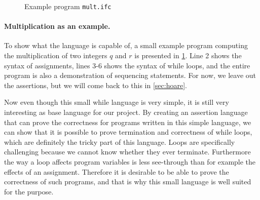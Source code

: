 \begin{figure}

\caption{Example program \texttt{mult.ifc}}
\label{figure:basicmult}
\end{figure}

\paragraph{Multiplication as an example.}
To show what the language is capable of, a small example program computing the multiplication of two integers $q$ and $r$ is presented in \cref{figure:basicmult}. Line 2 shows the syntax of assignments, lines $3$-$6$ shows the syntax of while loops, and the entire program is also a demonstration of sequencing statements.
For now, we leave out the assertions, but we will come back to this in \cref{sec:hoare}.

Now even though this small while language is very simple, it is still very interesting as base language for our project.
By creating an assertion language that can prove the correctness for programs written in this simple language, we can show that it is possible to prove termination and correctness of while loops, which are definitely the tricky part of this language.
Loops are specifically challenging because we cannot know whether they ever terminate. Furthermore the way a loop affects program variables is less see-through than for example the effects of an assignment.
Therefore it is desirable to be able to prove the correctness of such programs, and that is why this small language is well suited for the purpose.
